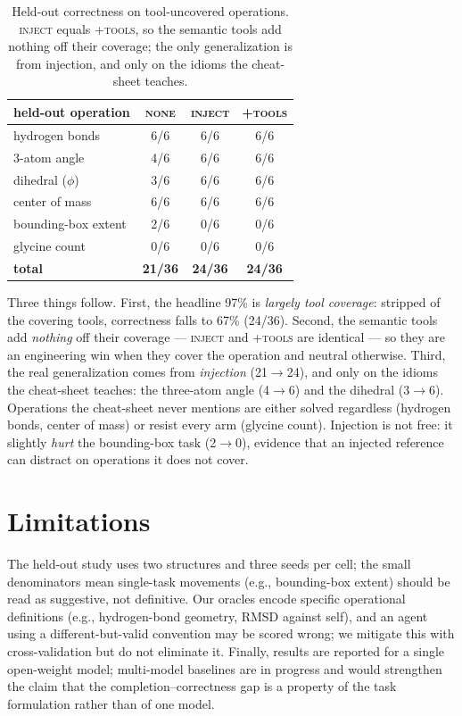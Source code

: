 \documentclass[11pt]{article}
\begin{document}
\begin{table}[h]
\centering
\small
\begin{tabular}{lccc}
\toprule
held-out operation & \textsc{none} & \textsc{inject} & \textsc{+tools} \\
\midrule
hydrogen bonds        & 6/6 & 6/6 & 6/6 \\
3-atom angle          & 4/6 & 6/6 & 6/6 \\
dihedral ($\phi$)     & 3/6 & 6/6 & 6/6 \\
center of mass        & 6/6 & 6/6 & 6/6 \\
bounding-box extent   & 2/6 & 0/6 & 0/6 \\
glycine count         & 0/6 & 0/6 & 0/6 \\
\midrule
\textbf{total}        & \textbf{21/36} & \textbf{24/36} & \textbf{24/36} \\
\bottomrule
\end{tabular}
\caption{Held-out correctness on tool-uncovered operations. \textsc{inject} equals \textsc{+tools},
so the semantic tools add nothing off their coverage; the only generalization is from injection,
and only on the idioms the cheat-sheet teaches.}
\label{tab:heldout}
\end{table}

Three things follow. First, the headline 97\% is \emph{largely tool coverage}: stripped of the
covering tools, correctness falls to 67\% (24/36). Second, the semantic tools add \emph{nothing}
off their coverage --- \textsc{inject} and \textsc{+tools} are identical --- so they are an
engineering win when they cover the operation and neutral otherwise. Third, the real
generalization comes from \emph{injection} (21$\to$24), and only on the idioms the cheat-sheet
teaches: the three-atom angle (4$\to$6) and the dihedral (3$\to$6). Operations the cheat-sheet
never mentions are either solved regardless (hydrogen bonds, center of mass) or resist every arm
(glycine count). Injection is not free: it slightly \emph{hurt} the bounding-box task (2$\to$0),
evidence that an injected reference can distract on operations it does not cover.

\section{Limitations}
The held-out study uses two structures and three seeds per cell; the small denominators mean
single-task movements (e.g., bounding-box extent) should be read as suggestive, not definitive.
Our oracles encode specific operational definitions (e.g., hydrogen-bond geometry, RMSD against
self), and an agent using a different-but-valid convention may be scored wrong; we mitigate this
with cross-validation but do not eliminate it. Finally, results are reported for a single
open-weight model; multi-model baselines are in progress and would strengthen the claim that the
completion--correctness gap is a property of the task formulation rather than of one model.
\end{document}
